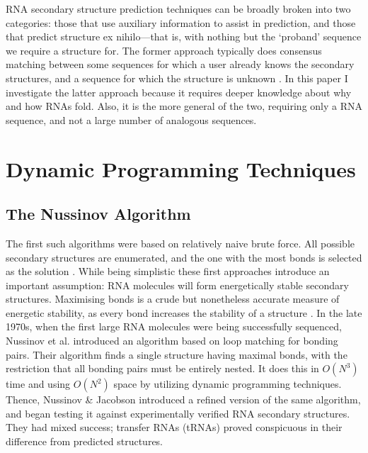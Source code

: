 \documentclass{cshonours}
\begin{document}
RNA secondary structure prediction techniques can be broadly broken into two categories: those that use auxiliary information to assist in prediction, and those that predict structure ex nihilo---that is, with nothing but the `proband' sequence we require a structure for. The former approach typically does consensus matching between some sequences for which a user already knows the secondary structures, and a sequence for which the structure is unknown \cite{hofacker2008rna}. In this paper I investigate the latter approach because it requires deeper knowledge about why and how RNAs fold. Also, it is the more general of the two, requiring only a RNA sequence, and not a large number of analogous sequences.



\section{Dynamic Programming Techniques}
\subsection{The Nussinov Algorithm}
The first such algorithms were based on relatively naive brute force. All possible secondary structures are enumerated, and the one with
the most bonds is selected as the solution \cite{nussinov1978algorithms}. While being simplistic
these first approaches introduce an important assumption: RNA molecules will
form energetically stable secondary structures. Maximising bonds is a crude but
nonetheless accurate measure of energetic stability, as every bond increases the
stability of a structure \cite{nussinov1978algorithms}. In the late 1970s, when the first large RNA molecules
were being successfully sequenced, Nussinov et al. \cite{nussinov1978algorithms} introduced an algorithm
based on loop matching for bonding pairs. Their algorithm finds a
single structure having maximal bonds, with the restriction that all bonding pairs must be entirely nested. It does this in $O(N^3)$ time and using $O(N^2)$ space by utilizing dynamic programming techniques. Thence, Nussinov \& Jacobson \cite{nussinov1980fast} introduced
a refined version of the same algorithm, and began testing it against experimentally verified RNA secondary structures. They had mixed success; transfer RNAs
(tRNAs) proved conspicuous in their difference from predicted structures.
\end{document}
